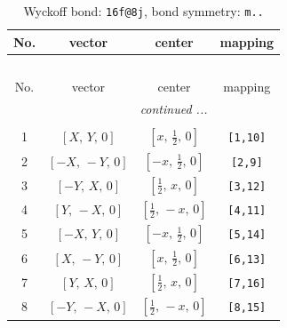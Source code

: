\documentclass[fleqn,8pt]{jsarticle}
\begin{document}
\begin{longtable}{cccc}
\caption{Wyckoff bond: {\tt 16f@8j}, bond symmetry: {\tt m..}}
 \\
 \hline \hline
No. & vector & center & mapping \\ \hline \endfirsthead

\multicolumn{3}{l}{\tablename\ \thetable{}} \\
 \hline \hline
No. & vector & center & mapping \\ \hline \endhead

 \hline \hline
\multicolumn{3}{r}{\footnotesize\it continued ...} \\ \endfoot

 \hline \hline
\multicolumn{3}{r}{} \\ \endlastfoot

1 & $\left[ X,\, Y,\, 0 \right]$ & $\left[ x,\, \frac{1}{2},\, 0 \right]$ & {\tt [1,10]} \\ \hline
2 & $\left[ - X,\, - Y,\, 0 \right]$ & $\left[ - x,\, \frac{1}{2},\, 0 \right]$ & {\tt [2,9]} \\ \hline
3 & $\left[ - Y,\, X,\, 0 \right]$ & $\left[ \frac{1}{2},\, x,\, 0 \right]$ & {\tt [3,12]} \\ \hline
4 & $\left[ Y,\, - X,\, 0 \right]$ & $\left[ \frac{1}{2},\, - x,\, 0 \right]$ & {\tt [4,11]} \\ \hline
5 & $\left[ - X,\, Y,\, 0 \right]$ & $\left[ - x,\, \frac{1}{2},\, 0 \right]$ & {\tt [5,14]} \\ \hline
6 & $\left[ X,\, - Y,\, 0 \right]$ & $\left[ x,\, \frac{1}{2},\, 0 \right]$ & {\tt [6,13]} \\ \hline
7 & $\left[ Y,\, X,\, 0 \right]$ & $\left[ \frac{1}{2},\, x,\, 0 \right]$ & {\tt [7,16]} \\ \hline
8 & $\left[ - Y,\, - X,\, 0 \right]$ & $\left[ \frac{1}{2},\, - x,\, 0 \right]$ & {\tt [8,15]} \\
\end{longtable}
\renewcommand{\arraystretch}{1.2}
\end{document}
